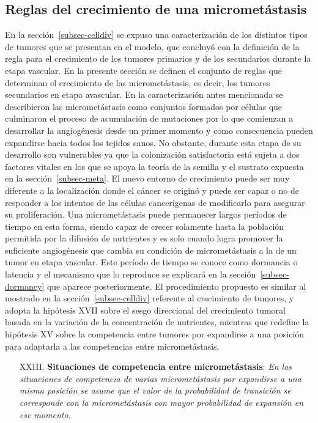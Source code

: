 \subsection{Reglas del crecimiento de una micromet\'astasis}
\label{subsec-micrometastasis}
En la secci\'on~\ref{subsec-celldiv} se expuso una caracterizaci\'on de los distintos tipos de tumores que se presentan en el modelo, que concluy\'o con la definici\'on de la regla para el crecimiento de los tumores primarios y de los secundarios durante la etapa vascular. En la presente secci\'on se definen el conjunto de reglas que determinan el crecimiento de las micromet\'astasis, es decir, los tumores secundarios en etapa avascular. En la caracterizaci\'on antes mencionada se describieron las micromet\'astasis como conjuntos formados por c\'elulas que culminaron el proceso de acumulaci\'on de mutaciones por lo que comienzan a desarrollar la angiog\'enesis desde un primer momento y como consecuencia pueden expandirse hacia todos los tejidos sanos. No obstante, durante esta etapa de su desarrollo son vulnerables ya que la colonizaci\'on satisfactoria est\'a sujeta a dos factores vitales en los que se apoya la teor\'ia de la semilla y el sustrato expuesta en la secci\'on~\ref{subsec-meta}. El nuevo entorno de crecimiento puede ser muy diferente a la localizaci\'on donde el c\'ancer se origin\'o y puede ser capaz o no de responder a los intentos de las c\'elulas cancer\'igenas de modificarlo para asegurar su proliferaci\'on. Una micromet\'astasis puede permanecer largos per\'iodos de tiempo en esta forma, siendo capaz de crecer solamente hasta la poblaci\'on permitida por la difusi\'on de nutrientes y es solo cuando logra promover la suficiente angiog\'enesis que cambia su condici\'on de micromet\'astasis a la de un tumor en etapa vascular. Este per\'iodo de tiempo se conoce como dormancia o latencia y el mecanismo que lo reproduce se explicar\'a en la secci\'on~\ref{subsec-dormancy} que aparece posteriormente. El procedimiento propuesto es similar al mostrado en la secci\'on~\ref{subsec-celldiv} referente al crecimiento de tumores, y adopta la hip\'otesis XVII sobre el sesgo direccional del crecimiento tumoral basada en la variaci\'on de la concentraci\'on de nutrientes, mientras que redefine la hip\'otesis XV sobre la competencia entre tumores por expandirse a una posici\'on para adaptarla a las competencias entre micromet\'astasis.

\begin{itemize}
\item [{XXIII.}] \textbf{Situaciones de competencia entre micromet\'astasis}: \emph{En las situaciones de competencia de varias micromet\'astasis por expandirse a una misma posici\'on se asume que el valor de la probabilidad de transici\'on se corresponde con la micromet\'astasis con mayor probabilidad de expansi\'on en ese momento.} \label{XXIII}
\end{itemize}

